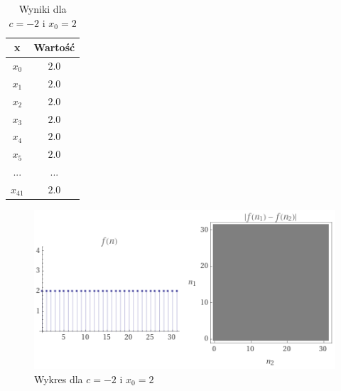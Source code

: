 \documentclass[a4paper,14pt]{report}
\begin{document}
    \begin{table}[H]
    \centering
    \begin{tabular}{|c | c |} 
     \hline
     x & Wartość \\ [0.5ex]
     \hline\hline
     $x_{0}$ & $2.0$ \\
     $x_{1}$ & $2.0$ \\
     $x_{2}$ & $2.0$ \\
     $x_{3}$ & $2.0$ \\
     $x_{4}$ & $2.0$  \\
     $x_{5}$ & $2.0$ \\
     ... & ... \\
     $x_{41}$ & $2.0$ \\
     \hline
    \end{tabular}
    \caption{Wyniki dla $c=-2$ i $x_{0}=2$}
    \label{Zad6b}
    \end{table}
    \begin{figure}[H]
      \includegraphics[scale=1.0]{wykresZad6b}
      \centering
      \caption{Wykres dla $c=-2$ i $x_{0}=2$}
    \end{figure}
\end{document}

